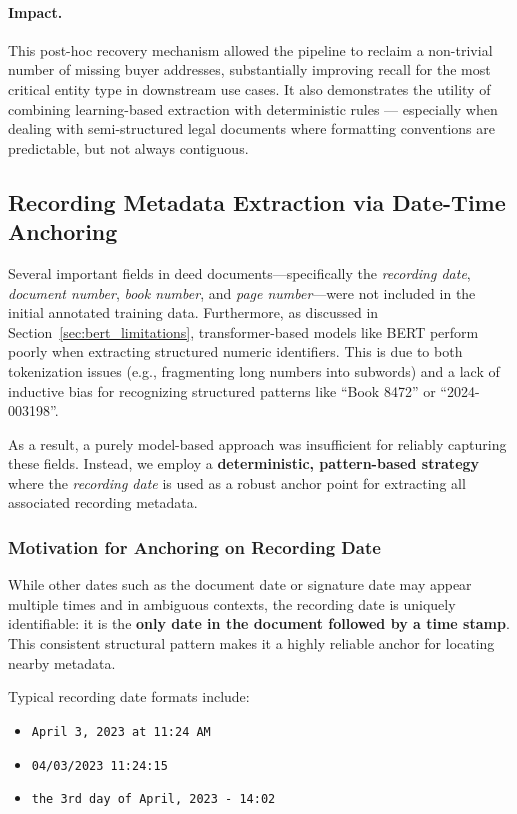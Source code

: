 \documentclass{article}
\begin{document}
\paragraph{Impact.}
This post-hoc recovery mechanism allowed the pipeline to reclaim a non-trivial number of missing buyer addresses, substantially improving recall for the most critical entity type in downstream use cases. It also demonstrates the utility of combining learning-based extraction with deterministic rules — especially when dealing with semi-structured legal documents where formatting conventions are predictable, but not always contiguous.

\subsection{Recording Metadata Extraction via Date-Time Anchoring}

Several important fields in deed documents—specifically the \textit{recording date}, \textit{document number}, \textit{book number}, and \textit{page number}—were not included in the initial annotated training data. Furthermore, as discussed in Section~\ref{sec:bert_limitations}, transformer-based models like BERT perform poorly when extracting structured numeric identifiers. This is due to both tokenization issues (e.g., fragmenting long numbers into subwords) and a lack of inductive bias for recognizing structured patterns like ``Book 8472'' or ``2024-003198''. 

As a result, a purely model-based approach was insufficient for reliably capturing these fields. Instead, we employ a \textbf{deterministic, pattern-based strategy} where the \textit{recording date} is used as a robust anchor point for extracting all associated recording metadata.

\subsubsection{Motivation for Anchoring on Recording Date}

While other dates such as the document date or signature date may appear multiple times and in ambiguous contexts, the recording date is uniquely identifiable: it is the \textbf{only date in the document followed by a time stamp}. This consistent structural pattern makes it a highly reliable anchor for locating nearby metadata.

Typical recording date formats include:

\begin{itemize}
    \item \texttt{April 3, 2023 at 11:24 AM}
    \item \texttt{04/03/2023 11:24:15}
    \item \texttt{the 3rd day of April, 2023 - 14:02}
\end{itemize}
\end{document}
